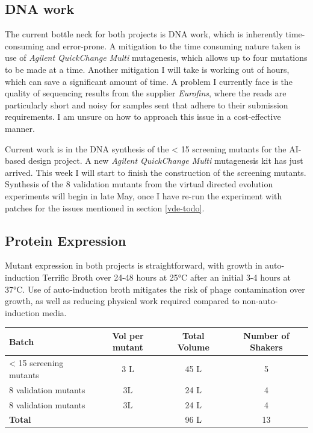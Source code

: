 \documentclass{article}
\begin{document}
\subsection{DNA work}
The current bottle neck for both projects is DNA work, which is inherently time-consuming and error-prone. A mitigation to the time consuming nature taken is use of \textit{Agilent QuickChange Multi} mutagenesis, which allows up to four mutations to be made at a time. Another mitigation I will take is working out of hours, which can save a significant amount of time. A problem I currently face is the quality of sequencing results from the supplier \textit{Eurofins}, where the reads are particularly short and noisy for samples sent that adhere to their submission requirements. I am unsure on how to approach this issue in a cost-effective manner.
\par 
Current work is in the DNA synthesis of the < 15 screening mutants for the AI-based design project. A new \textit{Agilent QuickChange Multi} mutagenesis kit has just arrived. This week I will start to finish the construction of the screening mutants. Synthesis of the 8 validation mutants from the virtual directed evolution experiments will begin in late May, once I have re-run the experiment with patches for the issues mentioned in section \ref{vde-todo}.
\par 
\subsection{Protein Expression}
Mutant expression in both projects is straightforward, with growth in auto-induction Terrific Broth over 24-48 hours at 25°C after an initial 3-4 hours at 37°C. Use of auto-induction broth mitigates the risk of phage contamination over growth, as well as reducing physical work required compared to non-auto-induction media.

\begin{table}[H]
	\begin{tabular}{lccc}
		\textbf{Batch} & \textbf{Vol per mutant} & \textbf{Total Volume} & \textbf{Number of Shakers} \\
		\hline
		< 15 screening mutants & 3 L & 45 L & 5 \\
		8 validation mutants & 3L & 24 L & 4 \\
		8 validation mutants & 3L & 24 L & 4 \\
		\hline
		\textbf{Total} & & 96 L & 13 \\
	\end{tabular}
\end{table}
\end{document}
